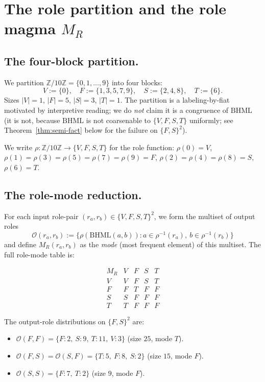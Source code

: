 \documentclass[11pt,reqno]{amsart}
\theoremstyle{plain}
\theoremstyle{definition}
\theoremstyle{remark}
\newcommand{\Z}{\mathbb{Z}}
\newcommand{\BH}{\mathrm{BHML}}
\newcommand{\Zten}{\Z/10\Z}
\begin{document}
\section{The role partition and the role magma $M_R$}
\label{sec:role-magma}

\subsection*{The four-block partition.}

We partition $\Zten = \{0, 1, \ldots, 9\}$ into four blocks:
\[
  V := \{0\}, \quad F := \{1, 3, 5, 7, 9\}, \quad
  S := \{2, 4, 8\}, \quad T := \{6\}.
\]
Sizes $|V| = 1$, $|F| = 5$, $|S| = 3$, $|T| = 1$. The partition
is a labeling-by-fiat motivated by interpretive reading; we do
\emph{not} claim it is a congruence of $\BH$ (it is not, because
$\BH$ is not coarsenable to $\{V, F, S, T\}$ uniformly; see
Theorem~\ref{thm:semi-fact} below for the failure on
$\{F, S\}^2$).

We write $\rho : \Zten \to \{V, F, S, T\}$ for the role function:
$\rho(0) = V$, $\rho(1) = \rho(3) = \rho(5) = \rho(7) = \rho(9)
= F$, $\rho(2) = \rho(4) = \rho(8) = S$, $\rho(6) = T$.

\subsection*{The role-mode reduction.}

For each input role-pair $(r_a, r_b) \in \{V, F, S, T\}^2$, we
form the multiset of output roles
\[
  \mathcal{O}(r_a, r_b) := \{\rho(\BH(a, b)) : a \in \rho^{-1}(r_a),
  \ b \in \rho^{-1}(r_b)\}
\]
and define $M_R(r_a, r_b)$ as the \emph{mode} (most frequent
element) of this multiset. The full role-mode table is:

\begin{equation*}
\begin{array}{c|cccc}
M_R & V & F & S & T \\ \hline
V & V & F & S & T \\
F & F & T & F & F \\
S & S & F & F & F \\
T & T & F & F & F
\end{array}
\end{equation*}

The output-role distributions on $\{F, S\}^2$ are:
\begin{itemize}\setlength\itemsep{2pt}
\item $\mathcal{O}(F, F) = \{F: 2,\ S: 9,\ T: 11,\ V: 3\}$ (size
$25$, mode $T$).
\item $\mathcal{O}(F, S) = \mathcal{O}(S, F) = \{T: 5,\ F: 8,\
S: 2\}$ (size $15$, mode $F$).
\item $\mathcal{O}(S, S) = \{F: 7,\ T: 2\}$ (size $9$, mode $F$).
\end{itemize}
\end{document}
